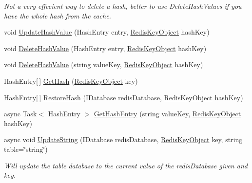 \begin{DoxyCompactItemize}
\begin{DoxyCompactList}\small\item\em Not a very effecient way to delete a hash, better to use Delete\+Hash\+Values if you have the whole hash from the cache. \end{DoxyCompactList}\item 
void \hyperlink{class_demgel_redis_1_1_backing_manager_1_1_table_redis_backup_ab5bde991a33b01a79974c7646f7ce095}{Update\+Hash\+Value} (Hash\+Entry entry, \hyperlink{class_demgel_redis_1_1_common_1_1_redis_key_object}{Redis\+Key\+Object} hash\+Key)
\item 
void \hyperlink{class_demgel_redis_1_1_backing_manager_1_1_table_redis_backup_ad50f5694655be933e5bc28fbcb6582f4}{Delete\+Hash\+Value} (Hash\+Entry entry, \hyperlink{class_demgel_redis_1_1_common_1_1_redis_key_object}{Redis\+Key\+Object} hash\+Key)
\item 
void \hyperlink{class_demgel_redis_1_1_backing_manager_1_1_table_redis_backup_afd8440f585c10a7729e8108720939f04}{Delete\+Hash\+Value} (string value\+Key, \hyperlink{class_demgel_redis_1_1_common_1_1_redis_key_object}{Redis\+Key\+Object} hash\+Key)
\item 
Hash\+Entry\mbox{[}$\,$\mbox{]} \hyperlink{class_demgel_redis_1_1_backing_manager_1_1_table_redis_backup_a55e95dab2aec1b0b39a5d463956862f3}{Get\+Hash} (\hyperlink{class_demgel_redis_1_1_common_1_1_redis_key_object}{Redis\+Key\+Object} key)
\item 
Hash\+Entry\mbox{[}$\,$\mbox{]} \hyperlink{class_demgel_redis_1_1_backing_manager_1_1_table_redis_backup_a07d3687007574e626d1849842b38c036}{Restore\+Hash} (I\+Database redis\+Database, \hyperlink{class_demgel_redis_1_1_common_1_1_redis_key_object}{Redis\+Key\+Object} hash\+Key)
\item 
async Task$<$ Hash\+Entry $>$ \hyperlink{class_demgel_redis_1_1_backing_manager_1_1_table_redis_backup_ad0dc112c45eeb41176cc66ca57f079d3}{Get\+Hash\+Entry} (string value\+Key, \hyperlink{class_demgel_redis_1_1_common_1_1_redis_key_object}{Redis\+Key\+Object} hash\+Key)
\item 
async void \hyperlink{class_demgel_redis_1_1_backing_manager_1_1_table_redis_backup_a2bcedf06f3ada316aee7ab83550202bb}{Update\+String} (I\+Database redis\+Database, \hyperlink{class_demgel_redis_1_1_common_1_1_redis_key_object}{Redis\+Key\+Object} key, string table=\char`\"{}string\char`\"{})
\begin{DoxyCompactList}\small\item\em Will update the table database to the current value of the redis\+Database given and key. \end{DoxyCompactList}\item 

\end{DoxyCompactItemize}
